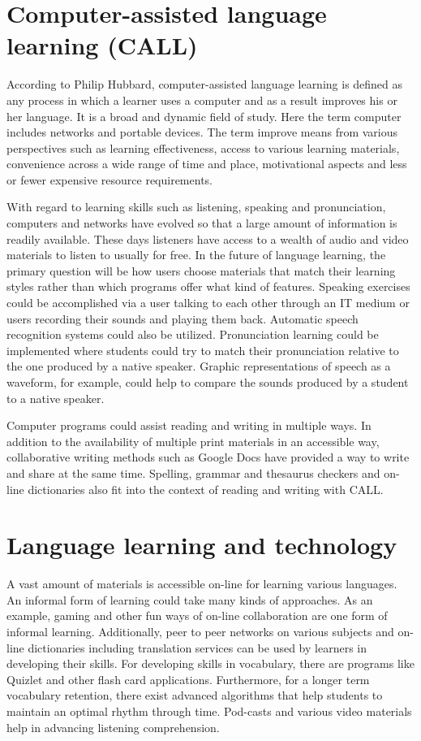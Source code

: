 \documentclass[11pt,a4paper,oneside,article]{memoir}
\begin{document}
\section{Computer-assisted language learning (CALL)}
According to Philip Hubbard, computer-assisted language learning is defined as any process in which a learner uses a computer and as a result improves his or her language. It is a broad and dynamic field of study. Here the term computer includes networks and portable devices. The term improve means from various perspectives such as learning effectiveness, access to various learning materials, convenience across a wide range of time and place, motivational aspects and less or fewer expensive resource requirements. \cite{hubbard}

With regard to learning skills such as listening, speaking and pronunciation, computers and networks have evolved so that a large amount of information is readily available. These days listeners have access to a wealth of audio and video materials to listen to usually for free. In the future of language learning, the primary question will be how users choose materials that match their learning styles rather than which programs offer what kind of features. Speaking exercises could be accomplished via a user talking to each other through an IT medium or users recording their sounds and playing them back. Automatic speech recognition systems could also be utilized. Pronunciation learning could be implemented where students could try to match their pronunciation relative to the one produced by a native speaker. Graphic representations of speech as a waveform, for example, could help to compare the sounds produced by a student to a native speaker. \cite{hubbard}

Computer programs could assist reading and writing in multiple ways. In addition to the availability of multiple print materials in an accessible way, collaborative writing methods such as Google Docs have provided a way to write and share at the same time. Spelling, grammar and thesaurus checkers and on-line dictionaries also fit into the context of reading and writing with CALL. \cite{hubbard}

\section{Language learning and technology}
A vast amount of materials is accessible on-line for learning various languages. An informal form of learning could take many kinds of approaches. As an example, gaming and other fun ways of on-line collaboration are one form of  informal learning. Additionally, peer to peer networks on various subjects and on-line dictionaries including translation services can be used by learners in developing their skills. For developing skills in vocabulary, there are programs like Quizlet and other flash card applications. Furthermore, for a longer term vocabulary retention, there exist advanced algorithms that help students to maintain an optimal rhythm through time. Pod-casts and various video materials help in advancing listening comprehension. 
\end{document}
